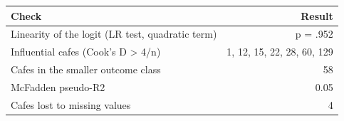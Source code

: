 \begin{tabular}{lr}
\toprule
Check & Result \\
\midrule
Linearity of the logit (LR test, quadratic term) & p = .952 \\
Influential cafes (Cook's D > 4/n) & 1, 12, 15, 22, 28, 60, 129 \\
Cafes in the smaller outcome class & 58 \\
McFadden pseudo-R2 & 0.05 \\
Cafes lost to missing values & 4 \\
\bottomrule
\end{tabular}
